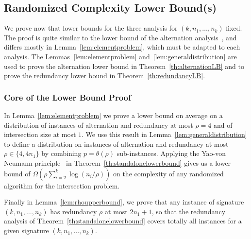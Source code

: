 \subsection{Randomized Complexity Lower Bound(s)}\label{sec:lowerbound}

We prove now that lower bounds for the three analysis for
$(k,n_1,\ldots,n_k)$ fixed.
%
The proof is quite similar to the lower bound of the alternation
analysis~\cite{adaptiveIntersectionAndTThresholdProblems}, and differs
mostly in Lemma~\ref{lem:elementproblem}, which must be adapted to
each analysis.
%
The Lemmas~\ref{lem:elementproblem} and~\ref{lem:generaldistribution}
are used to prove the alternation lower bound in
Theorem~\ref{th:alternationLB} and to prove the redundancy lower bound
in Theorem~\ref{th:redundancyLB}.


\subsubsection{Core of the Lower Bound Proof}
\label{sec:core-lower-bound}

In {Lemma~\ref{lem:elementproblem}} we prove a lower bound on average
on a distribution of instances of alternation
and redundancy at most $\rho=4$ and of intersection size at
most $1$.
%
We use this result in {Lemma~\ref{lem:generaldistribution}} to define
a distribution on instances of alternation and
redundancy at most $\rho\in\{4,4n_1\}$ by combining $p=\theta(\rho)$
sub-instances.
%
Applying the Yao-von Neumann
principle~\cite{vonneumann1944,sion58,yao} in {
Theorem~\ref{th:standalonelowerbound}} gives us a lower bound of
$\Omega(\rho\sum_{i=2}^k\log(n_i/\rho))$ on the complexity of any
randomized algorithm for the intersection problem.


Finally in {Lemma~\ref{lem:rhoupperbound}}, we prove that any instance
of signature $(k,n_1,\ldots,n_k)$ has redundancy $\rho$ at most
$2n_1+1$, so that the redundancy analysis of
Theorem~\ref{th:standalonelowerbound} covers totally all instances for
a given signature $(k,n_1,\ldots,n_k)$.





